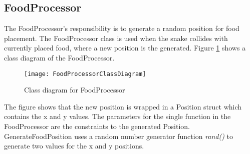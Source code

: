 \subsection{FoodProcessor}
	The FoodProcessor's responsibility is to generate a random position for food placement. The FoodProcessor class is used when the snake collides with currently placed food, where a new position is the generated. Figure \ref{fig:classFood} shows a class diagram of the FoodProcessor.

		\begin{figure}[H]
			\centering
			\texttt{[image: FoodProcessorClassDiagram]}
			\caption{Class diagram for FoodProcessor}
			\label{fig:classFood}
		\end{figure}
		
	The figure shows that the new position is wrapped in a Position struct which contains the x and y values. The parameters for the single function in the FoodProcessor are the constraints to the generated Position. GenerateFoodPosition uses a random number generator function \textit{rand()} to generate two values for the x and y positions.	